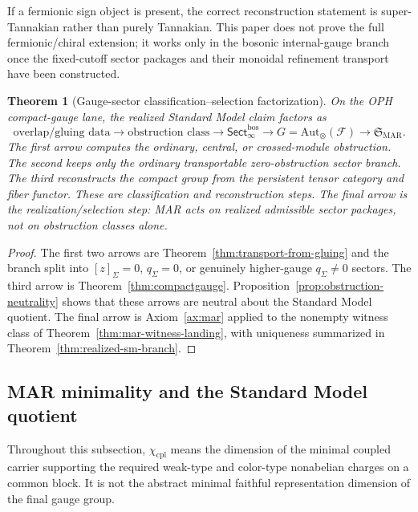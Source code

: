 \documentclass[11pt]{article}
\newtheorem{theorem}{Theorem}[section]
\begin{document}
If a fermionic sign object is present, the correct reconstruction statement is super-Tannakian
rather than purely Tannakian. This paper does not prove the full fermionic/chiral extension; it
works only in the bosonic internal-gauge branch once the fixed-cutoff sector packages and their
monoidal refinement transport have been constructed.

\begin{theorem}[Gauge-sector classification--selection factorization]\label{thm:gauge-selection-factorization}
On the OPH compact-gauge lane, the realized Standard Model claim factors as
\[
\text{overlap/gluing data}
\longrightarrow
\text{obstruction class}
\longrightarrow
\mathsf{Sect}^{\mathrm{bos}}_\infty
\longrightarrow
G=\mathrm{Aut}_\otimes(\mathcal F)
\longrightarrow
\mathfrak S_{\mathrm{MAR}}.
\]
The first arrow computes the ordinary, central, or crossed-module obstruction. The second keeps
only the ordinary transportable zero-obstruction sector branch. The third reconstructs the compact
group from the persistent tensor category and fiber functor. These are classification and
reconstruction steps. The final arrow is the realization/selection step: MAR acts on realized
admissible sector packages, not on obstruction classes alone.
\end{theorem}

\begin{proof}
The first two arrows are Theorem~\ref{thm:transport-from-gluing} and the branch split into
\([z]_\Sigma=0\), \(q_\Sigma=0\), or genuinely higher-gauge \(q_\Sigma\ne0\) sectors. The third
arrow is Theorem~\ref{thm:compactgauge}. Proposition~\ref{prop:obstruction-neutrality} shows that
these arrows are neutral about the Standard Model quotient. The final arrow is Axiom~\ref{ax:mar}
applied to the nonempty witness class of Theorem~\ref{thm:mar-witness-landing}, with uniqueness
summarized in Theorem~\ref{thm:realized-sm-branch}.
\end{proof}

\subsection{MAR minimality and the Standard Model quotient}

Throughout this subsection, $\chi_{\mathrm{cpl}}$ means the dimension of the minimal coupled carrier supporting the required weak-type and color-type nonabelian charges on a common block. It is not the abstract minimal faithful representation dimension of the final gauge group.
\end{document}
